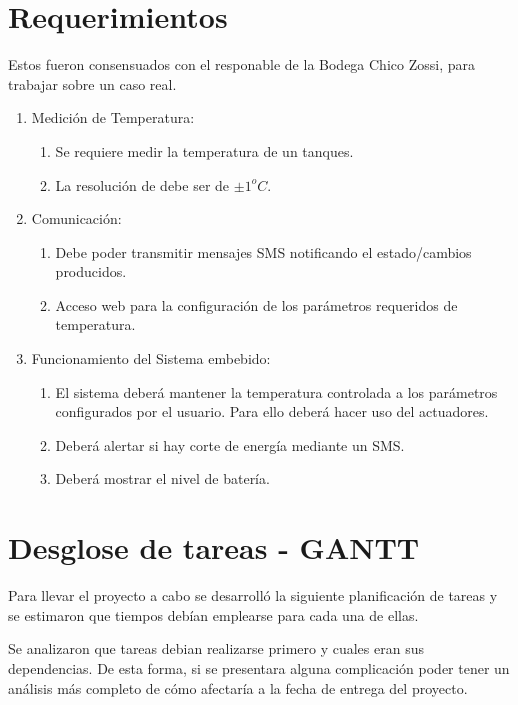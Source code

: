   \section{Requerimientos}

Estos fueron consensuados con el responable de la Bodega Chico Zossi, para trabajar sobre un caso real. 

\begin{enumerate}[label*=\arabic*.]
  \item Medición de Temperatura:
    \begin{enumerate}[label*=\arabic*.]
      \item  Se requiere medir la temperatura de un tanques.
      \item La resolución de debe ser de $\pm 1^oC$.
    \end{enumerate}
  \item Comunicación:
    \begin{enumerate}[label*=\arabic*.]
      \item Debe poder transmitir mensajes SMS notificando el estado/cambios producidos.
      \item Acceso web para la configuración de los parámetros requeridos de temperatura. 
    \end{enumerate}
  \item Funcionamiento del Sistema embebido:
    \begin{enumerate}[label*=\arabic*.]
      \item El sistema deberá mantener la temperatura controlada a los parámetros configurados por el usuario. Para ello deberá hacer uso del actuadores.
      \item Deberá alertar si hay corte de energía mediante un SMS.
      \item Deberá mostrar el nivel de batería.
  \end{enumerate}
\end{enumerate}


\section{Desglose de tareas - GANTT}
Para llevar el proyecto a cabo se desarrolló la siguiente planificación de tareas y se estimaron que tiempos debían emplearse para cada una de ellas.

Se analizaron que tareas debian realizarse primero y cuales eran sus dependencias. De esta forma, si se presentara alguna complicación poder tener un análisis más completo de cómo afectaría a la fecha de entrega del proyecto.

